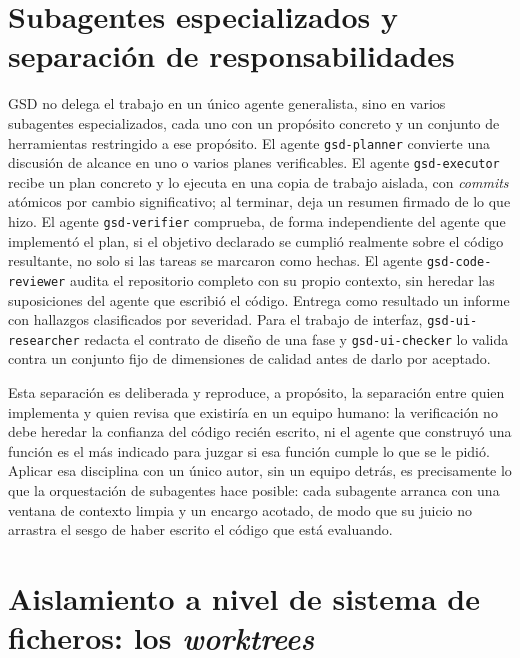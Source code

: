 \section{Subagentes especializados y separación de responsabilidades}\label{sec:gestion-subagentes}

GSD no delega el trabajo en un único agente generalista, sino en varios subagentes
especializados, cada uno con un propósito concreto y un conjunto de herramientas restringido a
ese propósito. El agente \texttt{gsd-planner} convierte una discusión de alcance en uno o
varios planes verificables. El agente \texttt{gsd-executor} recibe un plan concreto y lo ejecuta
en una copia de trabajo aislada, con \textit{commits} atómicos por cambio significativo; al
terminar, deja un resumen firmado de lo que hizo. El agente \texttt{gsd-verifier} comprueba, de forma
independiente del agente que implementó el plan, si el objetivo declarado se cumplió realmente
sobre el código resultante, no solo si las tareas se marcaron como hechas. El agente
\texttt{gsd-code-reviewer} audita el repositorio completo con su propio contexto, sin heredar
las suposiciones del agente que escribió el código. Entrega como resultado un informe con
hallazgos clasificados por severidad. Para el trabajo de interfaz, \texttt{gsd-ui-researcher} redacta el
contrato de diseño de una fase y \texttt{gsd-ui-checker} lo valida contra un conjunto fijo de
dimensiones de calidad antes de darlo por aceptado.

Esta separación es deliberada y reproduce, a propósito, la separación entre quien implementa y
quien revisa que existiría en un equipo humano: la verificación no debe heredar la confianza
del código recién escrito, ni el agente que construyó una función es el más indicado para
juzgar si esa función cumple lo que se le pidió. Aplicar esa disciplina con un único autor, sin
un equipo detrás, es precisamente lo que la orquestación de subagentes hace posible: cada
subagente arranca con una ventana de contexto limpia y un encargo acotado, de modo que su
juicio no arrastra el sesgo de haber escrito el código que está evaluando.

\section{Aislamiento a nivel de sistema de ficheros: los \textit{worktrees}}\label{sec:gestion-worktrees}

